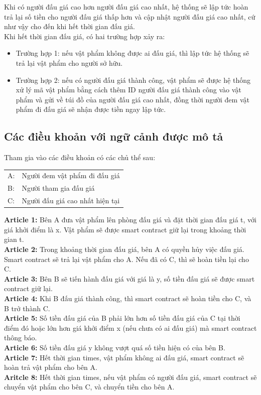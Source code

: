 \documentclass[a4paper]{article}
\begin{document}
Khi có người đấu giá cao hơn người đấu giá cao nhất, hệ thống sẽ lập tức hoàn trả lại số tiền cho người đấu giá thấp hơn và cập nhật người đấu giá cao nhất, cứ như vậy cho đến khi hết thời gian đấu giá. \\



Khi hết thời gian đấu giá, có hai trường hợp xảy ra: 
\begin{itemize}
    \item Trường hợp 1: nếu vật phẩm không được ai đấu giá, thì lập tức hệ thống sẽ trả lại vật phẩm cho người sở hữu. 
    \item Trường hợp 2: nếu có người đấu giá thành công, vật phẩm sẽ được hệ thống xử lý mã vật phẩm bằng cách thêm ID người đấu giá thành công vào vật phẩm và gửi về túi đồ của người đấu giá cao nhất, đồng thời người đem vật phẩm đi đấu giá sẽ nhận được tiền ngay lập tức.
\end{itemize}

\subsection{Các điều khoản với ngữ cảnh được mô tả}
\label{dieukhoan}
Tham gia vào các điều khoản có các chủ thể sau:\\
\begin{center}
    \begin{tabular}{ll}
         A: &  Người đem vật phẩm đi đấu giá\\
         B: &  Người tham gia đấu giá\\
         C: &  Người đấu giá cao nhất hiện tại\\
    \end{tabular}
\end{center}
\textbf{Article 1:} Bên A đưa vật phẩm lên phòng đấu giá và đặt thời gian đấu giá t, với giá khởi điểm là x. Vật phẩm sẽ được smart contract giữ lại trong khoảng thời gian t.\\
\textbf{Article 2:} Trong khoảng thời gian đấu giá, bên A có quyền hủy việc đấu giá. Smart contract sẽ trả lại vật phẩm cho A. Nếu đã có C, thì sẽ hoàn tiền lại cho C.\\
\textbf{Article 3:} Bên B sẽ tiến hành đấu giá với giá là y, số tiền đấu giá sẽ được smart contract giữ lại.\\
\textbf{Article 4:}  Khi B đấu giá thành công, thì smart contract sẽ hoàn tiền cho C, và B trở thành C.\\
\textbf{Article 5:} Số tiền đấu giá của B phải lớn hơn số tiền đấu giá của C tại thời điểm đó hoặc lớn hơn giá khởi điểm x (nếu chưa có ai đấu giá) mà smart contract thông báo.\\
\textbf{Article 6:} Số tiền đấu giá y không vượt quá số tiền hiện có của bên B.  \\
\textbf{Article 7:} Hết thời gian times, vật phẩm không ai đấu giá, smart contract sẽ hoàn trả vật phẩm cho bên A.\\
\textbf{Aritcle 8:} Hết thời gian times, nếu vật phẩm có người đấu giá, smart contract sẽ chuyển vật phẩm cho bên C, và chuyển tiền cho bên A.\\
\end{document}
